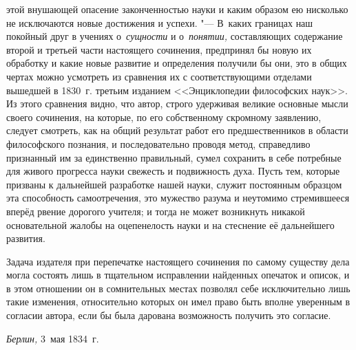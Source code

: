 этой внушающей опасение законченностью науки и каким образом ею нисколько не
исключаются новые достижения и успехи. "--- В~каких границах наш покойный друг
в учениях о~{\em сущности} и о~{\em понятии,} составляющих содержание второй и
третьей части настоящего сочинения, предпринял бы новую их обработку и какие
новые развитие и определения получили бы они, это в общих чертах можно
усмотреть из сравнения их с соответствующими отделами вышедшей в 1830~г.
третьим изданием <<Энциклопедии философских наук>>. Из этого сравнения видно,
что автор, строго удерживая великие основные мысли своего сочинения, на
которые, по его собственному скромному заявлению, следует смотреть, как на
общий результат работ его предшественников в области философского познания, и
последовательно проводя метод, справедливо признанный им за единственно
правильный, сумел сохранить в себе потребные для живого прогресса науки
свежесть и подвижность духа. Пусть тем, которые призваны к дальнейшей
разработке нашей науки, служит постоянным образцом эта способность
самоотречения, это мужество разума и неутомимо стремившееся вперёд рвение
дорогого учителя; и тогда не может возникнуть никакой основательной жалобы на
оцепенелость науки и на стеснение её дальнейшего развития.

Задача издателя при перепечатке настоящего сочинения по самому существу дела
могла состоять лишь в тщательном исправлении найденных опечаток и описок, и
в этом отношении он в сомнительных местах позволял себе исключительно лишь
такие изменения, относительно которых он имел право быть вполне уверенным в
согласии автора, если бы была дарована возможность получить это согласие.

{\em Берлин,} 3~мая 1834~г.
